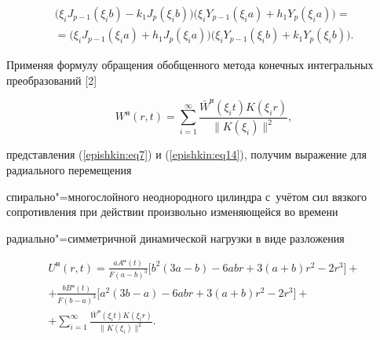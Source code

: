 \begin{multline}

\label{epishkin:eq28}

 \bigl( \xi _i  J_{p-1} (\xi _i b)-k_1 J_p (\xi _i b) \bigr) 

 \bigl( {\xi _i  Y_{p-1} (\xi _i a)+h_1 Y_p (\xi _i a)} \bigr) =\\

 =

  \bigl( {\xi _i  J_{p-1} (\xi _i a)+h_1 J_p (\xi _i a)} \bigr)  

 \bigl( {\xi _i  Y_{p-1} (\xi _i b)+k_1 Y_p(\xi _i b)} \bigr) .

\end{multline}



Применяя формулу обращения обобщенного метода конечных интегральных преобразований [2]

\begin{equation}

\label{epishkin:eq29}

W^{\text{н}}(r,t)=\sum\limits_{i=1}^\infty  \frac{\bar  W ^{\text{н}}(\xi _i t)  K(\xi _i r)}{\| K(\xi _i )\|^2} ,

\end{equation}

представления (\ref{epishkin:eq7}) и (\ref{epishkin:eq14}), получим выражение для радиального перемещения 

спирально"=многослойного неоднородного цилиндра с~учётом сил вязкого сопротивления при действии произвольно изменяющейся во времени 

радиально"=симметричной динамической нагрузки в виде разложения

\begin{multline}

\label{epishkin:eq30}

U^{\text{н}} (r,t)=

\frac{a  A^{\text{н}}(t)}{F(a-b)^3}  

\bigl[ b^2(3a-b)-6abr+3(a+b)r^2-2r^3 \bigr]+ \\ 

 +\frac{b  B^{\text{н}}(t)}{F(b-a)^3}  

 \bigl[ a^2(3b-a)-6abr+3(a+b)r^2-2r^3 \bigr]+ \\+

 \sum\limits_{i=1}^\infty \frac{\bar  W ^{\text{н}}(\xi _i t)K(\xi _i r)} {\| K(\xi_i )\|^2}.

\end{multline}

